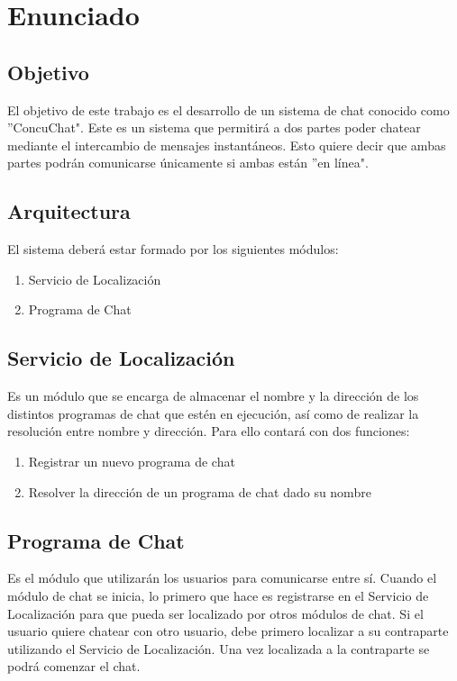 \section{Enunciado}

\subsection*{Objetivo}

El objetivo de este trabajo es el desarrollo de un sistema de chat conocido como ''ConcuChat".  Este 
es un sistema que permitirá a dos partes poder chatear mediante el intercambio de mensajes 
instantáneos.  Esto quiere decir que ambas partes podrán comunicarse únicamente si ambas están 
''en línea".

\subsection*{Arquitectura}

El sistema deberá estar formado por los siguientes módulos:

\begin{enumerate}
  \item Servicio de Localización
  \item Programa de Chat
\end{enumerate}

\subsection*{Servicio de Localización}

Es un módulo que se encarga de almacenar el nombre y la dirección de los distintos programas de 
chat que estén en ejecución, así como de realizar la resolución entre nombre y dirección.  Para ello 
contará con dos funciones:

\begin{enumerate}
  \item Registrar un nuevo programa de chat
  \item Resolver la dirección de un programa de chat dado su nombre
\end{enumerate}

\subsection*{Programa de Chat}

Es el módulo que utilizarán los usuarios para comunicarse entre sí.
Cuando el módulo de chat se inicia, lo primero que hace es registrarse en el Servicio de 
Localización para que pueda ser localizado por otros módulos de chat.  Si el usuario quiere chatear 
con otro usuario, debe primero localizar a su contraparte utilizando el Servicio de Localización. 
Una vez localizada a la contraparte se podrá comenzar el chat.


